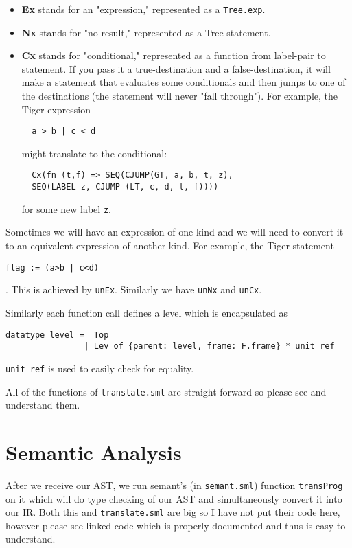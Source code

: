 \begin{itemize}

\item \textbf{Ex} stands for an "expression," represented as a \texttt{Tree.exp}.
\item \textbf{Nx} stands for "no result," represented as a Tree statement.
\item \textbf{Cx} stands for "conditional," represented as a function from label-pair to  statement. If you pass it a true-destination and a false-destination, it will make a statement that evaluates some conditionals and then jumps to one of the  destinations (the statement will never "fall through"). For example, the Tiger expression 
  \begin{verbatim}
  a > b | c < d
  \end{verbatim} 
  might translate to the  conditional:
  \begin{verbatim}
  Cx(fn (t,f) => SEQ(CJUMP(GT, a, b, t, z),
  SEQ(LABEL z, CJUMP (LT, c, d, t, f))))
  \end{verbatim}
  for some new label \texttt{z}.
\end{itemize}

Sometimes we will have an expression of one kind and we will need to convert it to an equivalent expression of another kind. For example, the Tiger statement
\begin{verbatim}
flag := (a>b | c<d)
\end{verbatim}
. This is achieved by \texttt{unEx}. Similarly we have \texttt{unNx} and \texttt{unCx}.

Similarly each function call defines a level which is encapsulated as 
\begin{verbatim}
datatype level =  Top
                | Lev of {parent: level, frame: F.frame} * unit ref
\end{verbatim} 

\texttt{unit ref} is used to easily check for equality.

All of the functions of \texttt{translate.sml} are straight forward so please see and understand them.

\section{Semantic Analysis}


After we receive our AST, we run semant's (in \texttt{semant.sml}) function \texttt{transProg} on it which will do type checking of our AST and simultaneously convert it into our IR. Both this and \texttt{translate.sml} are big so I have not put their code here, however please see linked code which is properly documented and thus is easy to understand.